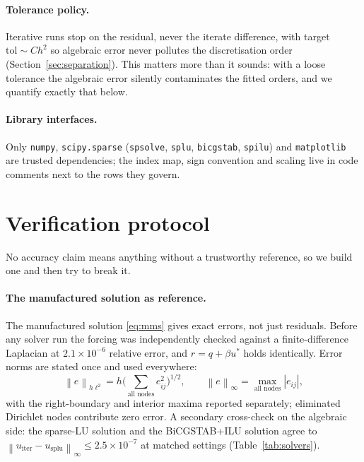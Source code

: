 \documentclass[11pt,a4paper]{article}
\newcommand{\norm}[1]{\left\lVert #1 \right\rVert}
\begin{document}
\paragraph{Tolerance policy.} Iterative runs stop on the residual, never the
iterate difference, with target $\mathrm{tol} \sim C h^2$ so algebraic error
never pollutes the discretisation order (Section~\ref{sec:separation}).
This matters more than it sounds: with a loose tolerance the algebraic error
silently contaminates the fitted orders, and we quantify exactly that below.

\paragraph{Library interfaces.} Only \texttt{numpy},
\texttt{scipy.sparse} (\texttt{spsolve}, \texttt{splu}, \texttt{bicgstab},
\texttt{spilu}) and \texttt{matplotlib} are trusted dependencies; the index
map, sign convention and scaling live in code comments next to the rows they
govern.

\section{Verification protocol}
\label{sec:verif}

No accuracy claim means anything without a trustworthy reference, so we build
one and then try to break it.

\paragraph{The manufactured solution as reference.} The manufactured solution
\eqref{eq:mms} gives exact errors, not just residuals. Before any solver run
the forcing was independently checked against a finite-difference Laplacian
at $2.1\times10^{-6}$ relative error, and $r = q + \beta u^*$ holds
identically. Error norms are stated once and used everywhere:
\begin{equation}\label{eq:norms}
\norm{e}_{h\ell^2} = h\Big(\sum_{\text{all nodes}} e_{ij}^2\Big)^{1/2},
\qquad
\norm{e}_\infty = \max_{\text{all nodes}} |e_{ij}|,
\end{equation}
with the right-boundary and interior maxima reported separately; eliminated
Dirichlet nodes contribute zero error. A secondary cross-check on the
algebraic side: the sparse-LU solution and the BiCGSTAB+ILU solution agree
to $\norm{u_{\mathrm{iter}} - u_{\mathrm{splu}}}_\infty \le
2.5\times10^{-7}$ at matched settings (Table~\ref{tab:solvers}).
\end{document}
